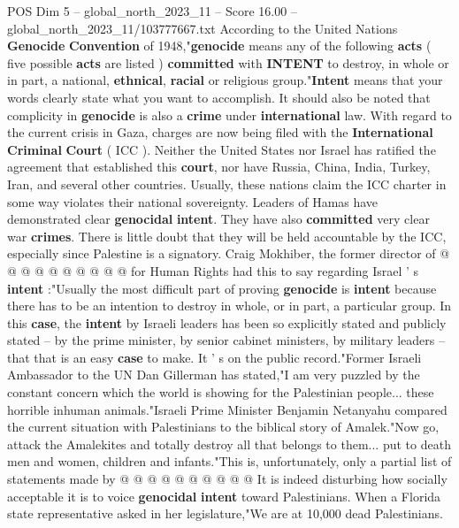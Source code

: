 \begin{textsample}{POS Dim 5 – global\_north\_2023\_11 – Score 16.00 – global\_north\_2023\_11/103777667.txt}  \label{ex:f5_pos_412}
According to the United Nations \textbf{Genocide} \textbf{Convention} of 1948,"\textbf{genocide} means any of the following \textbf{acts} ( five possible \textbf{acts} are listed ) \textbf{committed} with \textbf{INTENT} to destroy, in whole or in part, a national, \textbf{ethnical}, \textbf{racial} or religious group."\textbf{Intent} means that your words clearly state what you want to accomplish.
It should also be noted that complicity in \textbf{genocide} is also a \textbf{crime} under \textbf{international} law.
With regard to the current crisis in Gaza, charges are now being filed with the \textbf{International} \textbf{Criminal} \textbf{Court} ( ICC ).
Neither the United States nor Israel has ratified the agreement that established this \textbf{court}, nor have Russia, China, India, Turkey, Iran, and several other countries.
Usually, these nations claim the ICC charter in some way violates their national sovereignty.
Leaders of Hamas have demonstrated clear \textbf{genocidal} \textbf{intent}.
They have also \textbf{committed} very clear war \textbf{crimes}.
There is little doubt that they will be held accountable by the ICC, especially since Palestine is a signatory.
Craig Mokhiber, the former director of @ @ @ @ @ @ @ @ @ @ for Human Rights had this to say regarding Israel ' s \textbf{intent} :"Usually the most difficult part of proving \textbf{genocide} is \textbf{intent} because there has to be an intention to destroy in whole, or in part, a particular group.
In this \textbf{case}, the \textbf{intent} by Israeli leaders has been so explicitly stated and publicly stated -- by the prime minister, by senior cabinet ministers, by military leaders -- that that is an easy \textbf{case} to make.
It ' s on the public record."Former Israeli Ambassador to the UN Dan Gillerman has stated,"I am very puzzled by the constant concern which the world is showing for the Palestinian people... these horrible inhuman animals."Israeli Prime Minister Benjamin Netanyahu compared the current situation with Palestinians to the biblical story of Amalek."Now go, attack the Amalekites and totally destroy all that belongs to them... put to death men and women, children and infants."This is, unfortunately, only a partial list of statements made by @ @ @ @ @ @ @ @ @ @ It is indeed disturbing how socially acceptable it is to voice \textbf{genocidal} \textbf{intent} toward Palestinians.
When a Florida state representative asked in her legislature,"We are at 10,000 dead Palestinians.

\end{textsample}
